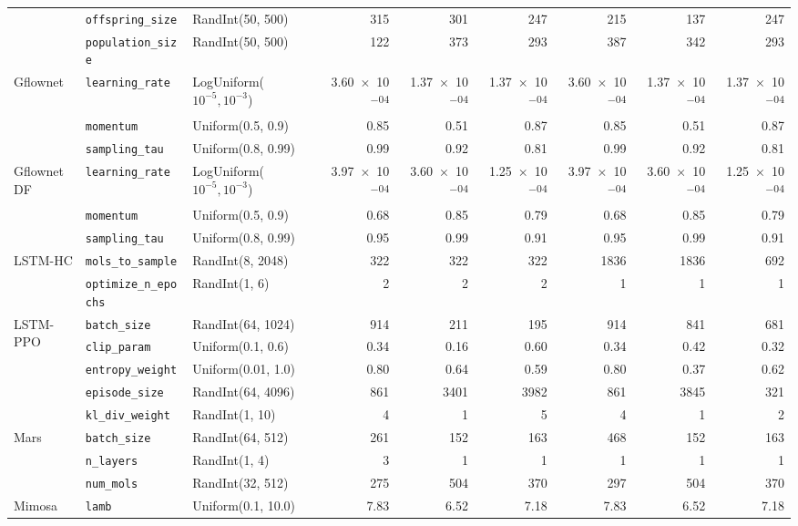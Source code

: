 \begin{tabular}{lllrrrrrr}
 & \texttt{offspring\_size} & RandInt(50, 500) & 315 & 301 & 247 & 215 & 137 & 247 \\
 & \texttt{population\_size} & RandInt(50, 500) & 122 & 373 & 293 & 387 & 342 & 293 \\
\midrule
\multirow[t]{3}{*}{Gflownet} & \texttt{learning\_rate} & LogUniform($10^{-5}, 10^{-3}$) & \num{3.60e-04} & \num{1.37e-04} & \num{1.37e-04} & \num{3.60e-04} & \num{1.37e-04} & \num{1.37e-04} \\
 & \texttt{momentum} & Uniform(0.5, 0.9) & 0.85 & 0.51 & 0.87 & 0.85 & 0.51 & 0.87 \\
 & \texttt{sampling\_tau} & Uniform(0.8, 0.99) & 0.99 & 0.92 & 0.81 & 0.99 & 0.92 & 0.81 \\
\midrule
\multirow[t]{3}{*}{GflownetDF} & \texttt{learning\_rate} & LogUniform($10^{-5}, 10^{-3}$) & \num{3.97e-04} & \num{3.60e-04} & \num{1.25e-04} & \num{3.97e-04} & \num{3.60e-04} & \num{1.25e-04} \\
 & \texttt{momentum} & Uniform(0.5, 0.9) & 0.68 & 0.85 & 0.79 & 0.68 & 0.85 & 0.79 \\
 & \texttt{sampling\_tau} & Uniform(0.8, 0.99) & 0.95 & 0.99 & 0.91 & 0.95 & 0.99 & 0.91 \\
\midrule
\multirow[t]{2}{*}{LSTM-HC} & \texttt{mols\_to\_sample} & RandInt(8, 2048) & 322 & 322 & 322 & 1836 & 1836 & 692 \\
 & \texttt{optimize\_n\_epochs} & RandInt(1, 6) & 2 & 2 & 2 & 1 & 1 & 1 \\
\midrule
\multirow[t]{5}{*}{LSTM-PPO} & \texttt{batch\_size} & RandInt(64, 1024) & 914 & 211 & 195 & 914 & 841 & 681 \\
 & \texttt{clip\_param} & Uniform(0.1, 0.6) & 0.34 & 0.16 & 0.60 & 0.34 & 0.42 & 0.32 \\
 & \texttt{entropy\_weight} & Uniform(0.01, 1.0) & 0.80 & 0.64 & 0.59 & 0.80 & 0.37 & 0.62 \\
 & \texttt{episode\_size} & RandInt(64, 4096) & 861 & 3401 & 3982 & 861 & 3845 & 321 \\
 & \texttt{kl\_div\_weight} & RandInt(1, 10) & 4 & 1 & 5 & 4 & 1 & 2 \\
\midrule
\multirow[t]{3}{*}{Mars} & \texttt{batch\_size} & RandInt(64, 512) & 261 & 152 & 163 & 468 & 152 & 163 \\
 & \texttt{n\_layers} & RandInt(1, 4) & 3 & 1 & 1 & 1 & 1 & 1 \\
 & \texttt{num\_mols} & RandInt(32, 512) & 275 & 504 & 370 & 297 & 504 & 370 \\
\midrule
\multirow[t]{3}{*}{Mimosa} & \texttt{lamb} & Uniform(0.1, 10.0) & 7.83 & 6.52 & 7.18 & 7.83 & 6.52 & 7.18 \\

\end{tabular}

